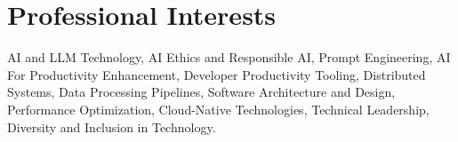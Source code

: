 
\section{Professional Interests}
\scriptsize{AI and LLM Technology, AI Ethics and Responsible AI, Prompt Engineering, AI For Productivity 
    Enhancement, Developer Productivity Tooling, Distributed Systems, Data Processing Pipelines,
    Software Architecture and Design, Performance Optimization, Cloud-Native Technologies, Technical
    Leadership, Diversity and Inclusion in Technology.}